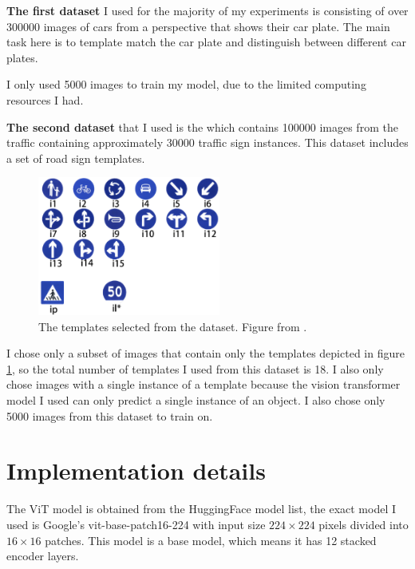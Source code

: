 \documentclass{report}[12pt, a4paper]
\begin{document}
\textbf{The first dataset} I used for the majority of my experiments is \cite{carplate_dataset_paper} consisting of over 300000 images of cars from a perspective that shows their car plate. The main task here is to template match the car plate and distinguish between different car plates.

I only used 5000 images to train my model, due to the limited computing resources I had.

\textbf{The second dataset} that I used is the \cite{traffic_sign_dataset_paper} which contains 100000 images from the traffic containing approximately 30000 traffic sign instances. This dataset includes a set of road sign templates.

\begin{figure}[htp]
    \centering
    \includegraphics[width=6cm]{traffic_sign_templates}
    \caption{The templates selected from the dataset. Figure from \cite{traffic_sign_dataset_paper}.}
    \label{fig:traffic_sign_templates}
\end{figure}

I chose only a subset of images that contain only the templates depicted in figure \ref{fig:traffic_sign_templates}, so the total number of templates I used from this dataset is 18. I also only chose images with a single instance of a template because the vision transformer model I used can only predict a single instance of an object. I also chose only 5000 images from this dataset to train on.


\section{Implementation details}

The ViT model is obtained from the HuggingFace model list, the exact model I used is Google's vit-base-patch16-224 with input size $224\times224$ pixels divided into $16\times16$ patches. This model is a base model, which means it has 12 stacked encoder layers.
\end{document}
